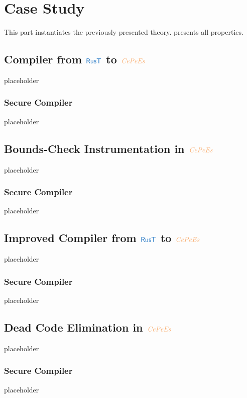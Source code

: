 \documentclass[a4paper,12pt]{article}
\begin{document}
\section{Case Study}\label{sec-cs}
This part instantiates the previously presented theory. 
 presents all properties. 








\subsection{Compiler from $\src{RusT}$ to $\irl{CePeEs}$}\label{subsec-rust-to-cepees}
placeholder
\subsubsection{Secure Compiler}\label{subsec-rust-to-cepees-seccomp}
placeholder

\subsection{Bounds-Check Instrumentation in $\irl{CePeEs}$}\label{subsec-softbounds-in-cepees}
placeholder
\subsubsection{Secure Compiler}\label{subsec-softbounds-cepees-seccomp}
placeholder

\subsection{Improved Compiler from $\src{RusT}$ to $\irl{CePeEs}$}\label{subsec-improved-rust-to-cepees}
placeholder
\subsubsection{Secure Compiler}\label{subsec-improved-rust-to-cepees-seccomp}
placeholder

\subsection{Dead Code Elimination in $\irl{CePeEs}$}\label{subsec-dce-in-cepees}
placeholder
\subsubsection{Secure Compiler}\label{subsec-dce-cepees-seccomp}
placeholder
\end{document}

